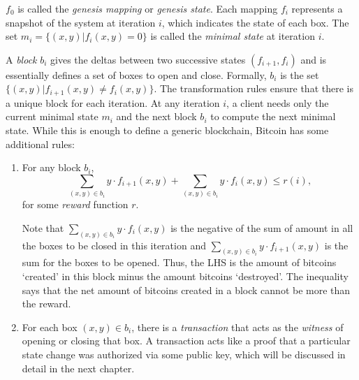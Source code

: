 \documentclass[]{report}   %
\begin{document}
{$f_0$ is called the {\em genesis mapping} or {\em genesis state}. Each mapping $f_i$ represents a snapshot of the system at iteration $i$, which indicates the state of each box. 
The set $m_i=\{(x, y)| f_i(x, y) = 0\}$ is called the {\em minimal state} at iteration $i$. 

A {\em block} $b_i$ gives the deltas between two successive states $(f_{i+1}, f_{i})$ and is essentially defines a set of boxes to open and close. Formally, $b_{i}$ is the set $\{(x, y)|f_{i+1}(x, y)\neq f_i(x, y)\}$. The transformation rules ensure that there is a unique block for each iteration. At any iteration $i$, a client needs only the current minimal state $m_i$ and the next block $b_i$ to compute the next minimal state. 
While this is enough to define a generic blockchain, Bitcoin has some additional rules:

\begin{enumerate}
	\item For any block $b_{i}$, $$\sum_{(x, y)\in b_{i}} y\cdot f_{i+1}(x, y) +\sum_{(x, y)\in b_{i}} y\cdot f_{i}(x, y) \leq  r(i),$$ for some {\em reward} function $r$.
	
	Note that $\sum_{(x, y)\in b_{i}} y\cdot f_{i}(x, y)$ is the negative of the sum of amount in all the boxes to be closed in this iteration and $\sum_{(x, y)\in b_{i}} y\cdot f_{i+1}(x, y)$ is the sum for the boxes to be opened. Thus, the LHS is the amount of bitcoins `created' in this block minus the amount bitcoins `destroyed'. The inequality says that the net amount of bitcoins created in a block cannot be more than the reward. 
	\item For each box $(x, y)\in b_i$, there is a {\em transaction} that acts as the {\em witness} of opening or	closing that box. A transaction acts like a proof that a particular state change was authorized via some public key, which will be discussed in detail in the next chapter. 
\end{enumerate}

}
\end{document}
